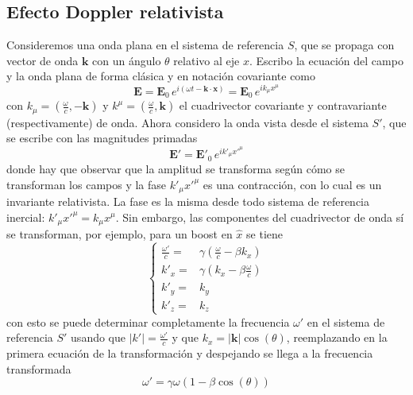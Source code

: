 \subsection{Efecto Doppler relativista}
Consideremos una onda plana en el sistema de referencia $S$, que se propaga con vector de onda $\textbf{k}$ con un ángulo $\theta$ relativo al eje $x$. Escribo la ecuación del campo y la onda plana de forma clásica y en notación covariante como
\begin{equation*}
    \textbf{E}
    = \textbf{E}_{0}\,e^{i(\omega t - \textbf{k}\cdot\textbf{x})} 
    = \textbf{E}_{0}\,e^{ik_{\mu}x^{\mu}}
\end{equation*}
con $k_{\mu} = \left( \frac{\omega}{c}, -\textbf{k}\right)$ y $k^{\mu} = \left( \frac{\omega}{c}, \textbf{k}\right)$ el cuadrivector covariante y contravariante (respectivamente) de onda. Ahora considero la onda vista desde el sistema $S'$, que se escribe con las magnitudes primadas
\begin{equation*}
    \textbf{E}' = \textbf{E}'_{0}\,e^{ik'_{\mu}x'^{\mu}}
\end{equation*}
donde hay que observar que la amplitud se transforma según cómo se transforman los campos y la fase $k'_{\mu}x'^{\mu}$ es una contracción, con lo cual es un invariante relativista. La fase es la misma desde todo sistema de referencia inercial: $k'_{\mu}x'^{\mu} = k_{\mu}x^{\mu}$. Sin embargo, las componentes del cuadrivector de onda sí se transforman, por ejemplo, para un boost en $\hat{x}$ se tiene
\begin{equation*}
    \left\{
        \begin{array}{ll}
            \frac{\omega'}{c} 
            = &\gamma
            \left(
                \frac{\omega}{c} - \beta k_{x}
            \right)\\
            k'_{x} = &\gamma
            \left(
                k_{x} - \beta\frac{\omega}{c}
            \right)\\
            k'_{y} = & k_{y}\\
            k'_{z} = & k_{z}
        \end{array}
    \right.
\end{equation*}
con esto se puede determinar completamente la frecuencia $\omega'$ en el sistema de referencia $S'$ usando que $|k'| = \frac{\omega'}{c}$ y que $k_{x} = |\textbf{k}|\cos{(\theta)}$, reemplazando en la primera ecuación de la transformación y despejando se llega a la frecuencia transformada
\begin{equation*}
    \omega' = \gamma \omega (1 - \beta \cos{(\theta)})
\end{equation*}
